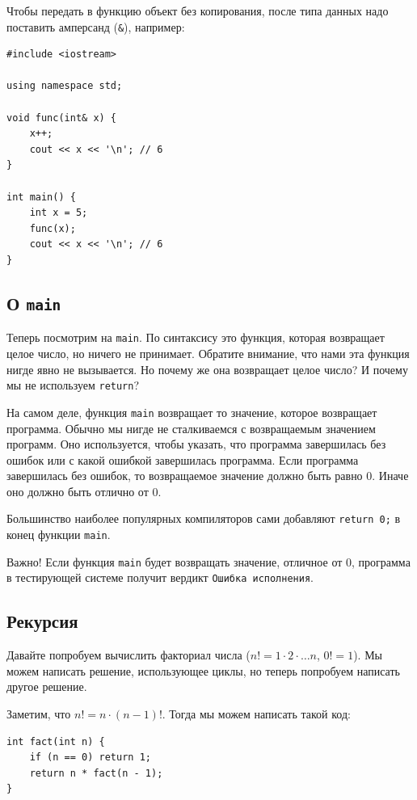 \documentclass{article}
\newcommand{\important}[1]{
	\begin{sectionenv}[red!30!white]{Важно!}
		#1
	\end{sectionenv}
}
\begin{document}
	Чтобы передать в функцию объект без копирования, после типа данных надо поставить амперсанд (\texttt{\&}), например:
	
	\begin{lstlisting}
#include <iostream>

using namespace std;

void func(int& x) {
	x++;
	cout << x << '\n'; // 6
}

int main() {
	int x = 5;
	func(x);
	cout << x << '\n'; // 6
}
	\end{lstlisting}

	\subsection{О \texttt{main}}

	Теперь посмотрим на \texttt{main}. По синтаксису это функция, которая возвращает целое число, но ничего не принимает. Обратите внимание, что нами эта функция нигде явно не вызывается. Но почему же она возвращает целое число? И почему мы не используем \texttt{return}?

	На самом деле, функция \texttt{main} возвращает то значение, которое возвращает программа. Обычно мы нигде не сталкиваемся с возвращаемым значением программ. Оно используется, чтобы указать, что программа завершилась без ошибок или с какой ошибкой завершилась программа. Если программа завершилась без ошибок, то возвращаемое значение должно быть равно $0$. Иначе оно должно быть отлично от $0$.

	Большинство наиболее популярных компиляторов сами добавляют \texttt{return 0;} в конец функции \texttt{main}.

	\important{Если функция \texttt{main} будет возвращать значение, отличное от $0$, программа в тестирующей системе получит вердикт \texttt{Ошибка исполнения}.}

	\subsection{Рекурсия}

	Давайте попробуем вычислить факториал числа ($n!=1\cdot2\cdot\dots n$, $0!=1$). Мы можем написать решение, использующее циклы, но теперь попробуем написать другое решение.
	
	Заметим, что $n!=n \cdot (n-1)!$. Тогда мы можем написать такой код:
	
	\begin{lstlisting}
int fact(int n) {
	if (n == 0) return 1;
	return n * fact(n - 1);
}
	\end{lstlisting}
	
\end{document}
